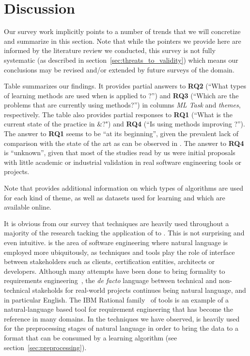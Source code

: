\section{Discussion}
\label{sec:discussion}

Our survey work implicitly points to a number of trends that we will
concretize and summarize in this section. Note that while the pointers we
provide here are informed by the literature review we conducted, this survey is
not fully systematic (as described in section~\ref{sec:threats_to_validity}) which
means our conclusions may be revised and/or extended by future surveys of the
domain.

Table  summarizes our findings. It provides partial answers to
\textbf{RQ2} (``What types of learning methods are used when \ML is applied to
\RE?'') and \textbf{RQ3} (``Which are the \RE problems that are currently using
\ML methods?'') in columns \emph{ML Task} and  \emph{themes}, respectively.
The table also provides partial responses to \textbf{RQ1} (``What is the current
state of the practice in \ML${\&}$\RE?") and \textbf{RQ4} (``Is using \ML
methods improving \RE?''). The answer to \textbf{RQ1} seems to be ``at its
beginning'', given the prevalent lack of comparison with the state of the art
as can be observed in . The answer to \textbf{RQ4} is
``unknown'', given that most of the studies read by us were initial proposals
with little academic or industrial validation in real software engineering tools or projects.

Note that  provides additional information on which types of
algorithms are used for each kind of theme, as well as datasets used for
learning and which are available online.

It is obvious from our survey that \NLP techniques are heavily used
throughout a majority of the research tacking the application of \ML to
\RE. This is not surprising and even intuitive. \RE is the area of software
engineering where natural language is employed more ubiquitously, as \RE
techniques and tools play the role of interface between stakeholders such as
clients, certification entities, architects or developers. Although many
attempts have been done to bring formality to requirements
engineering~\cite{Teufl17,LucioRCA16}, the \emph{de facto} language between
technical and non-technical stakeholds for real-world projects continues being natural language, and in particular English.
The IBM Rational \DOORS family~\cite{doors} of tools is an example
of a natural-language based tool for requirement engineering that has become the
reference in many domains. In the techniques we have observed, \NLP is heavily
used for the preprocessing stages of natural language in order to bring the data to a format
that can be consumed by a learning algorithm (see
section~\ref{sec:preprocessing}).
 
